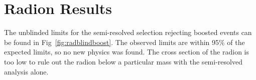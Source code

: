 
\section{Radion Results}

The unblinded limits for the semi-resolved selection rejecting boosted events can be found in Fig~\ref{fig:radblindboost}. The observed limits are within 95\% of the expected limits, so no new physics was found. The cross section of the radion is too low to rule out the radion below a particular mass with the semi-resolved analysis alone.

